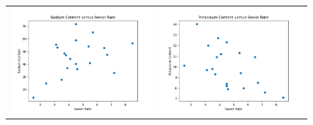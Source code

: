 \begin{enumerate}[label=(\alph*)]
\begin{figure}[H]
\begin{tabular}{cc}
        \end{tabular}
    \end{figure}

    \begin{figure}[H]
        \centering
        \begin{tabular}{cc}
            \includegraphics[scale=0.325]{./python/chapter-5/Question-5-4-Sweat-vs-Sodium.png} &
            \includegraphics[scale=0.325]{./python/chapter-5/Question-5-4-Sweat-vs-Potassium.png} \\

\end{tabular}
\end{figure}
\end{enumerate}

